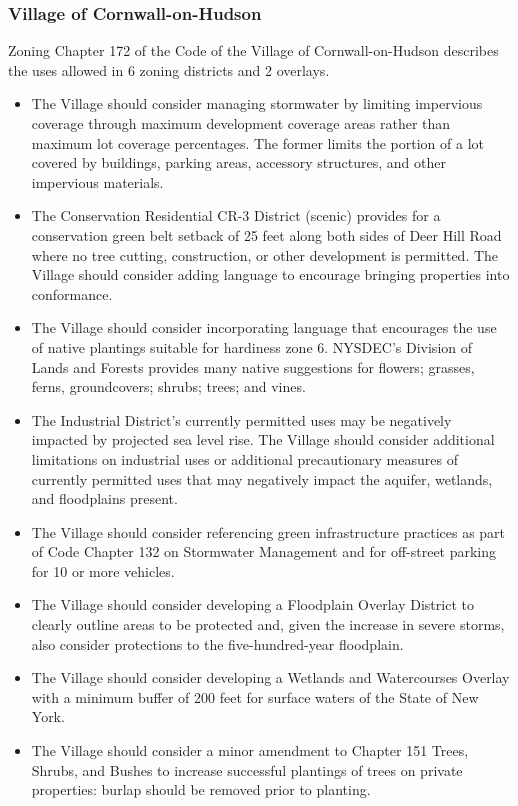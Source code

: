 \subsubsection{Village of Cornwall-on-Hudson}
Zoning Chapter 172 of the Code of the Village of Cornwall-on-Hudson describes 
the uses allowed in 6 zoning districts and 2 overlays.
\begin{itemize}
    \item The Village should consider managing stormwater by limiting 
    impervious coverage through maximum development coverage areas rather than 
    maximum lot coverage percentages. The former limits the portion of a lot 
    covered by buildings, parking areas, accessory structures, and other 
    impervious materials.
    \item The Conservation Residential CR-3 District (scenic) provides for a 
    conservation green belt setback of 25 feet along both sides of Deer Hill 
    Road where no tree cutting, construction, or other development is 
    permitted. The Village should consider adding language to encourage 
    bringing properties into conformance.
    \item The Village should consider incorporating language that encourages the 
    use of native plantings suitable for hardiness zone 6. NYSDEC’s Division of 
    Lands and Forests provides many native suggestions for flowers; grasses, 
    ferns, groundcovers; shrubs; trees; and vines.
    \item The Industrial District’s currently permitted uses may be negatively 
    impacted by projected sea level rise. The Village should consider 
    additional limitations on industrial uses or additional precautionary 
    measures of currently permitted uses that may negatively impact the 
    aquifer, wetlands, and floodplains present.
    \item The Village should consider referencing green infrastructure 
    practices as part of Code Chapter 132 on Stormwater Management and for 
    off-street parking for 10 or more vehicles.
    \item The Village should consider developing a Floodplain Overlay District 
    to clearly outline areas to be protected and, given the increase in severe 
    storms, also consider protections to the five-hundred-year floodplain.
    \item The Village should consider developing a Wetlands and Watercourses 
    Overlay with a minimum buffer of 200 feet for surface waters of the State of 
    New York.
    \item The Village should consider a minor amendment to Chapter 151 Trees, 
    Shrubs, and Bushes to increase successful plantings of trees on private 
    properties: burlap should be removed prior to planting.
\end{itemize}
\label{map:villagezoning}